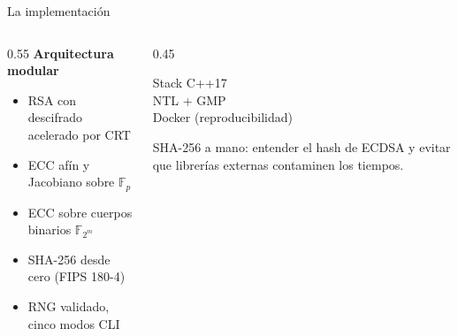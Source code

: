 \documentclass[aspectratio=169,11pt]{beamer}
\begin{document}
\begin{frame}{La implementación}
  \begin{columns}[c]
    \begin{column}{0.55\textwidth}
      \textbf{Arquitectura modular}
      \begin{itemize}
        \item RSA con descifrado acelerado por \alert{CRT}
        \item ECC afín y \alert{Jacobiano} sobre $\mathbb{F}_p$
        \item ECC sobre cuerpos binarios $\mathbb{F}_{2^m}$
        \item \alert{SHA-256 desde cero} (FIPS 180-4)
        \item RNG validado, cinco modos CLI
      \end{itemize}
    \end{column}
    \begin{column}{0.45\textwidth}
      \begin{block}{Stack}
        C++17 \\ NTL + GMP \\ Docker (reproducibilidad)
      \end{block}
      \footnotesize SHA-256 a mano: entender el hash de ECDSA y evitar que librerías
      externas contaminen los tiempos.
    \end{column}
  \end{columns}
\end{frame}
\end{document}
